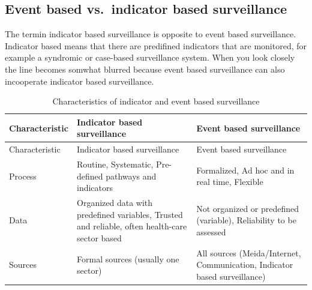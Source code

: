 \documentclass[
  letterpaper,
  DIV=11,
  numbers=noendperiod]{scrreprt}
\begin{document}
\subsection{Event based vs.~indicator based
surveillance}\label{event-based-vs.-indicator-based-surveillance}

The termin indicator based surveillance is opposite to event based
surveillance. Indicator based means that there are predifined indicators
that are monitored, for example a syndromic or case-based surveillance
system. When you look closely the line becomes somwhat blurred because
event based surveillance can also incooperate indicator based
surveillance.

\begin{longtable}[]{@{}
  >{\raggedright\arraybackslash}p{}
  >{\raggedright\arraybackslash}p{}
  >{\raggedright\arraybackslash}p{}@{}}
\caption{Characteristics of indicator and event based
surveillance}\tabularnewline
\toprule\noalign{}
\begin{minipage}[b]{\linewidth}\raggedright
Characteristic
\end{minipage} & \begin{minipage}[b]{\linewidth}\raggedright
Indicator based surveillance
\end{minipage} & \begin{minipage}[b]{\linewidth}\raggedright
Event based surveillance
\end{minipage} \\
\midrule\noalign{}
\endfirsthead
\toprule\noalign{}
\begin{minipage}[b]{\linewidth}\raggedright
Characteristic
\end{minipage} & \begin{minipage}[b]{\linewidth}\raggedright
Indicator based surveillance
\end{minipage} & \begin{minipage}[b]{\linewidth}\raggedright
Event based surveillance
\end{minipage} \\
\midrule\noalign{}
\endhead
\bottomrule\noalign{}
\endlastfoot
Process & Routine, Systematic, Pre-defined pathways and indicators &
Formalized, Ad hoc and in real time, Flexible \\
Data & Organized data with predefined variables, Trusted and reliable,
often health-care sector based & Not organized or predefined (variable),
Reliability to be assessed \\
Sources & Formal sources (usually one sector) & All sources
(Meida/Internet, Communication, Indicator based surveillance) \\
\end{longtable}
\end{document}
